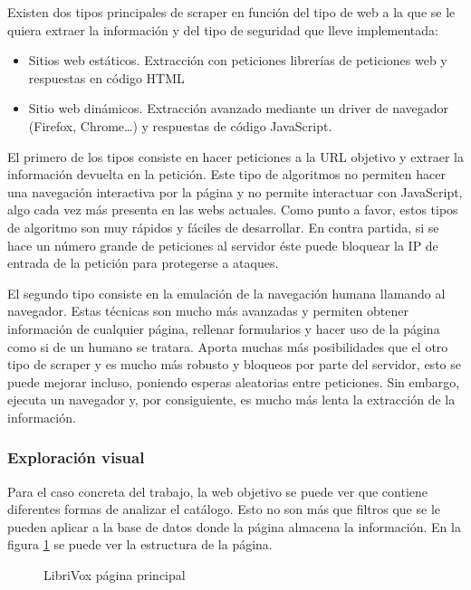 Existen dos tipos principales de \gls{scraper} en función del tipo de web a la que se le quiera extraer la información y del tipo de seguridad que lleve implementada:
\begin{itemize}
	\item Sitios web estáticos. Extracción con peticiones librerías de peticiones web y respuestas en código \gls{HTML}
	\item Sitio web dinámicos. Extracción avanzado mediante un driver de navegador (Firefox, Chrome\dots) y respuestas de código JavaScript.
\end{itemize}
El primero de los tipos consiste en hacer peticiones a la \gls{URL} objetivo y extraer la información devuelta en la petición. Este tipo de algoritmos no permiten hacer una navegación interactiva por la página y no permite interactuar con JavaScript, algo cada vez más presenta en las webs actuales. Como punto a favor, estos tipos de algoritmo son muy rápidos y fáciles de desarrollar. En contra partida, si se hace un número grande de peticiones al servidor éste puede bloquear la IP de entrada de la petición para protegerse a ataques.

El segundo tipo consiste en la emulación de la navegación humana llamando al navegador. Estas técnicas son mucho más avanzadas y permiten obtener información de cualquier página, rellenar formularios y hacer uso de la página como si de un humano se tratara. Aporta muchas más posibilidades que el otro tipo de \gls{scraper} y es mucho más robusto y bloqueos por parte del servidor, esto se puede mejorar incluso, poniendo esperas aleatorias entre peticiones. Sin embargo, ejecuta un navegador y, por consiguiente, es mucho más lenta la extracción de la información.

\subsubsection{Exploración visual}
Para el caso concreta del trabajo, la web objetivo se puede ver que contiene diferentes formas de analizar el catálogo. Esto no son más que filtros que se le pueden aplicar a la base de datos donde la página almacena la información. En la figura \ref{fig: librivox_cover} se puede ver la estructura de la página.
\begin{figure}[ht!]
	\centering
	\caption{LibriVox página principal}
	\label{fig: librivox_cover}
\end{figure}
